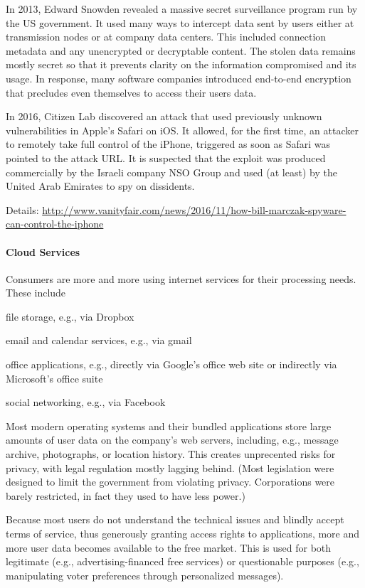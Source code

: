 In 2013, Edward Snowden revealed a massive secret surveillance program run by the US government.
It used many ways to intercept data sent by users either at transmission nodes or at company data centers.
This included connection metadata and any unencrypted or decryptable content.
The stolen data remains mostly secret so that it prevents clarity on the information compromised and its usage.
In response, many software companies introduced end-to-end encryption that precludes even themselves to access their users data.

In 2016, Citizen Lab discovered an attack that used previously unknown vulnerabilities in Apple's Safari on iOS.
It allowed, for the first time, an attacker to remotely take full control of the iPhone, triggered as soon as Safari was pointed to the attack URL.
It is suspected that the exploit was produced commercially by the Israeli company NSO Group and used (at least) by the United Arab Emirates to spy on dissidents.

Details: \url{http://www.vanityfair.com/news/2016/11/how-bill-marczak-spyware-can-control-the-iphone}

\paragraph{Cloud Services}
Consumers are more and more using internet services for their processing needs.
These include
\begin{compactitem}
\item file storage, e.g., via Dropbox
\item email and calendar services, e.g., via gmail
\item office applications, e.g., directly via Google's office web site or indirectly via Microsoft's office suite
\item social networking, e.g., via Facebook
\end{compactitem}
Most modern operating systems and their bundled applications store large amounts of user data on the company's web servers, including, e.g., message archive, photographs, or location history.
This creates unprecented risks for privacy, with legal regulation mostly lagging behind.
(Most legislation were designed to limit the government from violating privacy.
Corporations were barely restricted, in fact they used to have less power.)

Because most users do not understand the technical issues and blindly accept terms of service, thus generously granting access rights to applications, more and more user data becomes available to the free market.
This is used for both legitimate (e.g., advertising-financed free services) or questionable purposes (e.g., manipulating voter preferences through personalized messages).

